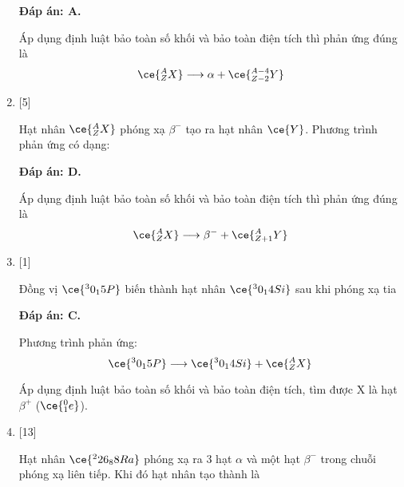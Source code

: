 \begin{enumerate}[label=\bfseries Câu \arabic*:]
	\loigiai
	{		\textbf{Đáp án: A.}
		
		Áp dụng định luật bảo toàn số khối và bảo toàn điện tích thì phản ứng đúng là
		$$\ce{^A_Z X} \longrightarrow \alpha + \ce{^{A-4}_{Z-2} Y}$$
		
	}
	\item {} [5]
	\cauhoi
	{Hạt nhân $\ce{^A_Z X}$ phóng xạ $\beta^-$ tạo ra hạt nhân $\ce{Y}$. Phương trình phản ứng có dạng:
	}
	
	\loigiai
	{		\textbf{Đáp án: D.}
		
		Áp dụng định luật bảo toàn số khối và bảo toàn điện tích thì phản ứng đúng là
		$$\ce{^A_Z X} \longrightarrow \beta^- + \ce{^{A}_{Z+1} Y}$$
		
	}
	\item {} [1]
	\cauhoi
	{Đồng vị $\ce{^30_15 P}$ biến thành hạt nhân $\ce{^30_14 Si}$ sau khi phóng xạ tia
	}
	
	\loigiai
	{		\textbf{Đáp án: C.}
		
		Phương trình phản ứng:
		$$\ce{^30_15 P} \longrightarrow \ce{^30_14 Si} + \ce{^A_Z X}$$
		
		Áp dụng định luật bảo toàn số khối và bảo toàn điện tích, tìm được X là hạt $\beta^+$ ($\ce{^0_1 e}$).
		
	}
	
	
	\item {} [13]
	\cauhoi
	{Hạt nhân $\ce{^226_88 Ra}$ phóng xạ ra 3 hạt $\alpha$ và một hạt $\beta^-$ trong chuỗi phóng xạ liên tiếp. Khi đó hạt nhân tạo thành là
	}
	

\end{enumerate}
